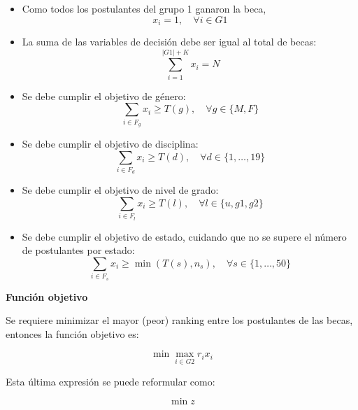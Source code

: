 \begin{itemize}
    \item Como todos los postulantes del grupo 1 ganaron la beca,
    \begin{equation}
    x_i = 1, \quad \forall i \in G1
    \end{equation}

    \item La suma de las variables de decisión debe ser igual al total de becas:
    \begin{equation}
    \sum_{i=1}^{|G1| + K} x_i = N
    \end{equation}

    \item Se debe cumplir el objetivo de género:
    \begin{equation}
    \sum_{i \in F_g} x_i \geq T(g), \quad \forall g \in \{M,F\}
    \end{equation}

    \item Se debe cumplir el objetivo de disciplina:
    \begin{equation}
    \sum_{i \in F_d} x_i \geq T(d), \quad \forall d \in \{1,\ldots,19\}
    \end{equation}

    \item Se debe cumplir el objetivo de nivel de grado:
    \begin{equation}
    \sum_{i \in F_l} x_i \geq T(l), \quad \forall l \in \{u,g1,g2\}
    \end{equation}

    \item Se debe cumplir el objetivo de estado, cuidando que no se supere el número de postulantes por estado:
    \begin{equation}
    \sum_{i \in F_s} x_i \geq \min(T(s),n_s), \quad \forall s \in \{1,\ldots,50\}
    \end{equation}
\end{itemize}

\textbf{Función objetivo}

Se requiere minimizar el mayor (peor) ranking entre los postulantes de las becas, entonces
la función objetivo es:

\begin{equation}
\min \max_{i \in G2} r_i x_i
\end{equation}

Esta última expresión se puede reformular como:

\begin{equation}
\min z
\end{equation}

